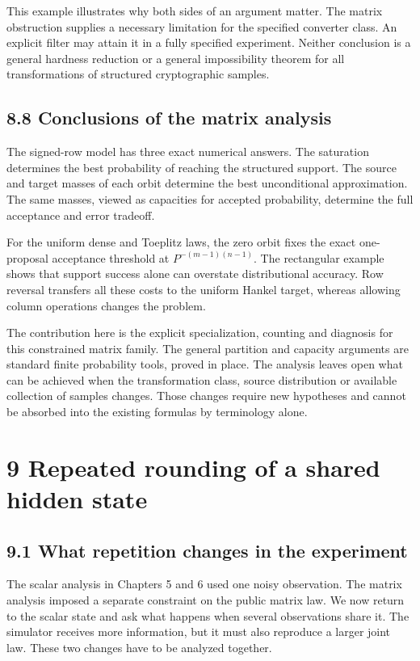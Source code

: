 \documentclass[
]{article}
\begin{document}
This example illustrates why both sides of an argument matter. The
matrix obstruction supplies a necessary limitation for the specified
converter class. An explicit filter may attain it in a fully specified
experiment. Neither conclusion is a general hardness reduction or a
general impossibility theorem for all transformations of structured
cryptographic samples.

\subsection{8.8 Conclusions of the matrix
analysis}\label{conclusions-of-the-matrix-analysis}

The signed-row model has three exact numerical answers. The saturation
determines the best probability of reaching the structured support. The
source and target masses of each orbit determine the best unconditional
approximation. The same masses, viewed as capacities for accepted
probability, determine the full acceptance and error tradeoff.

For the uniform dense and Toeplitz laws, the zero orbit fixes the exact
one-proposal acceptance threshold at \(P^{-(m-1)(n-1)}\). The
rectangular example shows that support success alone can overstate
distributional accuracy. Row reversal transfers all these costs to the
uniform Hankel target, whereas allowing column operations changes the
problem.

The contribution here is the explicit specialization, counting and
diagnosis for this constrained matrix family. The general partition and
capacity arguments are standard finite probability tools, proved in
place. The analysis leaves open what can be achieved when the
transformation class, source distribution or available collection of
samples changes. Those changes require new hypotheses and cannot be
absorbed into the existing formulas by terminology alone.

\section{9 Repeated rounding of a shared hidden
state}\label{repeated-rounding-of-a-shared-hidden-state}

\subsection{9.1 What repetition changes in the
experiment}\label{what-repetition-changes-in-the-experiment}

The scalar analysis in Chapters 5 and 6 used one noisy observation. The
matrix analysis imposed a separate constraint on the public matrix law.
We now return to the scalar state and ask what happens when several
observations share it. The simulator receives more information, but it
must also reproduce a larger joint law. These two changes have to be
analyzed together.
\end{document}
